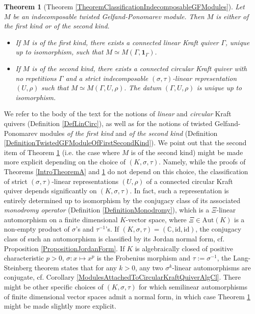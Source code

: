 \documentclass[12pt]{amsart}
\newtheorem{introtheorem}{Theorem}
\theoremstyle{definition}
\newcommand{\<}{\langle}   %
\renewcommand{\>}{\rangle} %
\begin{document}
\begin{introtheorem}[Theorem \ref{TheoremClassificationIndecomposableGFModules}]\label{IntroTheoremB}
    Let $M$ be an indecomposable twisted Gelfand-Ponomarev module. Then $M$ is either of the first kind or of the second kind. 
    \begin{itemize}
        \item If $M$ is of the first kind, there exists a connected linear Kraft quiver $\Gamma$, unique up to isomorphism, such that $M \simeq M(\Gamma,\mathbf 1_{\Gamma})$.
        \item If $M$ is of the second kind, there exists a connected circular Kraft quiver with no repetitions $\Gamma$ and a strict indecomposable $(\sigma,\tau)$-linear representation $(U,\rho)$ such that $M \simeq M(\Gamma,U,\rho)$. The datum $(\Gamma,U,\rho)$ is unique up to isomorphism.
    \end{itemize}
\end{introtheorem}

We refer to the body of the text for the notions of \textit{linear} and \textit{circular} Kraft quivers (Definition \ref{DefLinCirc}), as well as for the notions of twisted Gelfand-Ponomarev modules \textit{of the first kind} and \textit{of the second kind} (Definition \ref{DefinitionTwistedGFModuleOfFirstSecondKind}). We point out that the second item of Theorem \ref{IntroTheoremB} (i.e. the case where $M$ is of the second kind) might be made more explicit depending on the choice of $(K,\sigma,\tau)$. Namely, while the proofs of Theorems \ref{IntroTheoremA} and \ref{IntroTheoremB} do not depend on this choice, the classification of strict $(\sigma,\tau)$-linear representations $(U,\rho)$ of a connected circular Kraft quiver depends significantly on $(K,\sigma,\tau)$. In fact, such a representation is entirely determined up to isomorphism by the conjugacy class of its associated \textit{monodromy operator} (Definition \ref{DefinitionMonodromy}), which is a $\Xi$-linear automorphism on a finite dimensional $K$-vector space, where $\Xi \in \mathrm{Aut}(K)$ is a non-empty product of $\sigma$'s and $\tau^{-1}$'s. If $(K,\sigma,\tau) = (\mathbb C,\mathrm{id},\mathrm{id})$, the conjugacy class of such an automorphism is classified by its Jordan normal form, cf. Proposition \ref{PropositionJordanForm}. If $K$ is algebraically closed of positive characteristic $p>0$, $\sigma: x \mapsto x^p$ is the Frobenius morphism and $\tau := \sigma^{-1}$, the Lang-Steinberg theorem states that for any $k>0$, any two $\sigma^k$-linear automorphisms are conjugate, cf. Corollary \ref{ModulesAttachedToCircularKraftQuiverAlgCl}. There might be other specific choices of $(K,\sigma,\tau)$ for which semilinear automorphisms of finite dimensional vector spaces admit a normal form, in which case Theorem \ref{IntroTheoremB} might be made slightly more explicit.\\
\end{document}
